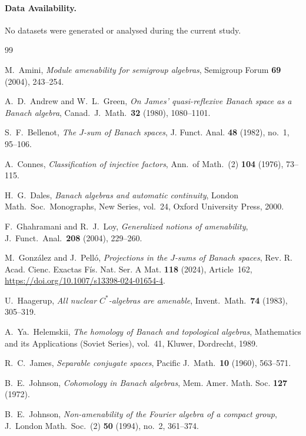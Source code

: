 \documentclass[reqno]{amsart}
\theoremstyle{plain}
\theoremstyle{definition}
\theoremstyle{remark}
\begin{document}
\paragraph{Data Availability.}
No datasets were generated or analysed during the current study.


\begin{thebibliography}{99}

M.~Amini,
\emph{Module amenability for semigroup algebras},
Semigroup Forum \textbf{69} (2004), 243--254.

A.~D.~Andrew and W.~L.~Green,
\emph{On James' quasi-reflexive Banach space as a Banach algebra},
Canad.\ J.\ Math.\ \textbf{32} (1980), 1080--1101.

S.~F.~Bellenot,
\emph{The $J$-sum of Banach spaces},
J. Funct. Anal. \textbf{48} (1982), no.~1, 95--106.

A.~Connes,
\emph{Classification of injective factors},
Ann.\ of Math.\ (2) \textbf{104} (1976), 73--115.

H.~G.~Dales,
\emph{Banach algebras and automatic continuity},
London Math.\ Soc.\ Monographs, New Series, vol.~24,
Oxford University Press, 2000.

F.~Ghahramani and R.~J.~Loy,
\emph{Generalized notions of amenability},
J.~Funct.\ Anal.\ \textbf{208} (2004), 229--260.

M.~Gonz\'alez and J.~Pell\'o,
\emph{Projections in the $J$-sums of Banach spaces},
Rev. R. Acad. Cienc. Exactas F\'{i}s. Nat. Ser. A Mat. \textbf{118} (2024), Article~162,
\url{https://doi.org/10.1007/s13398-024-01654-4}.

U.~Haagerup,
\emph{All nuclear $C^*$-algebras are amenable},
Invent.\ Math.\ \textbf{74} (1983), 305--319.

A.~Ya.~Helemskii,
\emph{The homology of Banach and topological algebras},
Mathematics and its Applications (Soviet Series), vol.~41,
Kluwer, Dordrecht, 1989.

R.~C.~James,
\emph{Separable conjugate spaces},
Pacific J.\ Math.\ \textbf{10} (1960), 563--571.

B.~E.~Johnson,
\emph{Cohomology in Banach algebras},
Mem. Amer. Math. Soc. \textbf{127} (1972).

B.~E.~Johnson,
\emph{Non-amenability of the Fourier algebra of a compact group},
J.~London Math.\ Soc.\ (2) \textbf{50} (1994), no.~2, 361--374.


\end{thebibliography}
\end{document}
